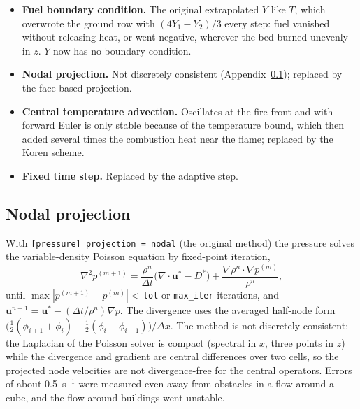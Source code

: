 \documentclass[11pt,a4paper]{article}
\newcommand{\vu}{\mathbf{u}}
\newcommand{\code}[1]{\texttt{#1}}
\begin{document}
\begin{itemize}
        with the first-order copy $\phi_0=\phi_1$ the energy added fell to 1.6\% and the worst
        undershoot from about 250~K to under 2~K). The copy itself still discarded the sources of the
        ground row and changed its density without any flux; the ground row is now a half cell with
        a zero-flux wall (Section~\ref{sec:ibc}).
  \item \textbf{Fuel boundary condition.} The original extrapolated $Y$ like $T$, which overwrote the
        ground row with $(4Y_1-Y_2)/3$ every step: fuel vanished without releasing heat, or went
        negative, wherever the bed burned unevenly in $z$. $Y$ now has no boundary condition.
  \item \textbf{Nodal projection.} Not discretely consistent (Appendix~\ref{app:nodal}); replaced by
        the face-based projection.
  \item \textbf{Central temperature advection.} Oscillates at the fire front and with forward Euler
        is only stable because of the temperature bound, which then added several times the
        combustion heat near the flame; replaced by the Koren scheme.
  \item \textbf{Fixed time step.} Replaced by the adaptive step.
\end{itemize}

\subsection{Nodal projection}\label{app:nodal}
With \code{[pressure] projection = nodal} (the original method) the pressure solves the
variable-density Poisson equation by fixed-point iteration,
\begin{equation}
  \nabla^2p^{(m+1)} = \frac{\rho^n}{\Delta t}\big(\nabla\cdot\vu^* - D^*\big)
  + \frac{\nabla\rho^n\cdot\nabla p^{(m)}}{\rho^n},
\end{equation}
until $\max|p^{(m+1)}-p^{(m)}|<$\,\code{tol} or \code{max\_iter} iterations, and
$\vu^{n+1} = \vu^* - (\Delta t/\rho^n)\nabla p$. The divergence uses the averaged half-node form
$\big(\tfrac12(\phi_{i+1}+\phi_i)-\tfrac12(\phi_i+\phi_{i-1})\big)/\Delta x$. The method is not
discretely consistent: the Laplacian of the Poisson solver is compact (spectral in $x$, three points in
$z$) while the divergence and gradient are central differences over two cells, so the projected node
velocities are not divergence-free for the central operators. Errors of about 0.5~s$^{-1}$ were
measured even away from obstacles in a flow around a cube, and the flow around buildings went
unstable.
\end{document}
